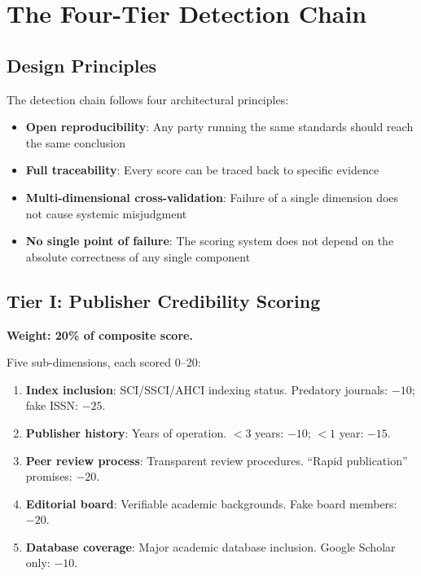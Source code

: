 \documentclass[11pt]{article}
\begin{document}
\section{The Four-Tier Detection Chain}
\label{sec:four-tier}

\subsection{Design Principles}

The detection chain follows four architectural principles:
\begin{itemize}
  \item \textbf{Open reproducibility}: Any party running the same standards should reach 
    the same conclusion
  \item \textbf{Full traceability}: Every score can be traced back to specific evidence
  \item \textbf{Multi-dimensional cross-validation}: Failure of a single dimension does 
    not cause systemic misjudgment
  \item \textbf{No single point of failure}: The scoring system does not depend on the 
    absolute correctness of any single component
\end{itemize}

\subsection{Tier I: Publisher Credibility Scoring}

\textbf{Weight: 20\% of composite score.}

Five sub-dimensions, each scored 0--20:
\begin{enumerate}
  \item \textbf{Index inclusion}: SCI/SSCI/AHCI indexing status. Predatory journals: $-10$; 
    fake ISSN: $-25$.
  \item \textbf{Publisher history}: Years of operation. $<3$ years: $-10$; $<1$ year: $-15$.
  \item \textbf{Peer review process}: Transparent review procedures. ``Rapid publication'' 
    promises: $-20$.
  \item \textbf{Editorial board}: Verifiable academic backgrounds. Fake board members: $-20$.
  \item \textbf{Database coverage}: Major academic database inclusion. Google Scholar only: $-10$.
\end{enumerate}
\end{document}

